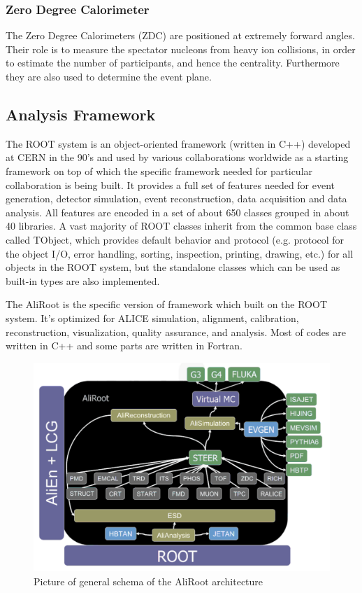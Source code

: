 \subsubsection{Zero Degree Calorimeter}

The Zero Degree Calorimeters (ZDC) \cite{oppedisano2009physics} are positioned at extremely forward angles. Their role is to measure the spectator nucleons from heavy ion collisions, in order to estimate the number of participants, and hence the centrality. Furthermore they are also used to determine the event plane. 

\subsection{Analysis Framework}

 The ROOT system is an object-oriented framework (written in C++) developed at CERN in the 90’s and used by various collaborations worldwide as a starting framework on top of which the specific framework needed for particular collaboration is being built. It provides a full set of features needed for event generation, detector simulation, event reconstruction, data acquisition and data analysis. All features are encoded in a set of about 650 classes grouped in about 40 libraries. A vast majority of ROOT classes inherit from the common base class called TObject, which provides default behavior and protocol (e.g. protocol for the object I/O, error handling, sorting, inspection, printing, drawing, etc.) for all objects in the ROOT system, but the standalone classes which can be used as built-in types are also implemented. 

The AliRoot is the specific version of framework which built on the ROOT system. It's optimized for ALICE simulation, alignment, calibration, reconstruction, visualization, quality assurance, and analysis. Most of codes are written in C++ and some parts are written in Fortran.


\begin{figure}[t]
\centerline{\includegraphics[width=12.0cm]{figures/aliroot}}
\caption{Picture of general schema of the AliRoot architecture \cite{aliroot}} 
\label{fig:cmsevt}
\end{figure}



